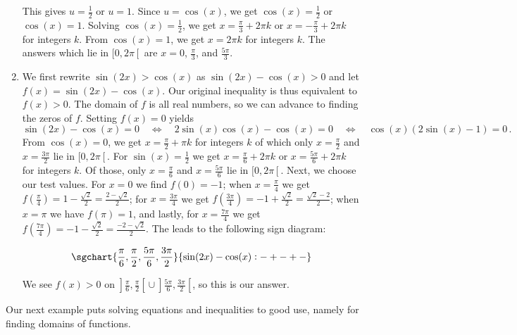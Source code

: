 \begin{example}
\begin{enumerate}
		This gives $u = \frac{1}{2}$ or $u = 1$.  Since $u = \cos(x)$, we get $\cos(x) = \frac{1}{2}$ or $\cos(x) = 1$.  Solving  $\cos(x) = \frac{1}{2}$, we get $x = \frac{\pi}{3} + 2\pi k$ or $x = -\frac{\pi}{3} + 2\pi k$ for integers $k$.  From $\cos(x) = 1$, we get $x = 2\pi k$ for integers $k$.  The answers which lie in $[0,2\pi\left[\right.$ are $x =0$,  $\frac{\pi}{3}$, and $\frac{5\pi}{3}$.  
		
		
		
		\item  We first rewrite  $\sin(2x) > \cos(x)$   as $\sin(2x) - \cos(x) > 0$ and let $f(x) = \sin(2x) - \cos(x)$.  Our original inequality is thus equivalent to $f(x) > 0$. The domain of $f$ is all real numbers, so we can advance to finding the zeros of $f$.  Setting $f(x) = 0$ yields 
		$$\sin(2x) - \cos(x) = 0\quad\Leftrightarrow\quad2\sin(x)\cos(x) - \cos(x) = 0\quad\Leftrightarrow\quad\cos(x) (2\sin(x) - 1) = 0\,.$$ 
		From $\cos(x) = 0$, we get $x = \frac{\pi}{2} + \pi k$ for integers $k$ of which only $x = \frac{\pi}{2}$ and $x = \frac{3\pi}{2}$ lie in $[0,2\pi\left[\right.$.  For  $\sin(x) = \frac{1}{2}$ we get $x = \frac{\pi}{6} + 2\pi k$ or $x = \frac{5\pi}{6} + 2\pi k$ for integers $k$.  Of those, only $x = \frac{\pi}{6}$ and $x = \frac{5\pi}{6}$ lie in $[0,2\pi\left[\right.$.  Next, we choose our test values.  For $x =0$ we find $f(0) = -1$; when $x = \frac{\pi}{4}$ we get $f\left(\frac{\pi}{4}\right) =1 - \frac{\sqrt{2}}{2} = \frac{2 - \sqrt{2}}{2}$;  for $x = \frac{3\pi}{4}$ we get $f\left(\frac{3\pi}{4}\right) =-1 + \frac{\sqrt{2}}{2} =  \frac{\sqrt{2} - 2}{2}$;  when $x=\pi$ we have $f(\pi) = 1$, and lastly, for $x = \frac{7\pi}{4}$ we get $f\left(\frac{7\pi}{4}\right) = -1 - \frac{\sqrt{2}}{2} =  \frac{-2 - \sqrt{2}}{2}$. The leads to the following sign diagram:
		
		$$
		\sgchart{\frac{\pi}{6},\frac{\pi}{2},\frac{5\pi}{6},\frac{3\pi}{2}} {\sin(2x) - \cos(x): -+-+-}
		$$
		
		We see $f(x) > 0$ on $\left.\right]\frac{\pi}{6}, \frac{\pi}{2}\left[\right. \cup \left.\right]\frac{5\pi}{6}, \frac{3\pi}{2}\left[\right.$, so this is our answer. 
		
		
	\end{enumerate}
	
\end{example}

Our next example puts solving equations and inequalities to good use, namely for finding domains of functions.


